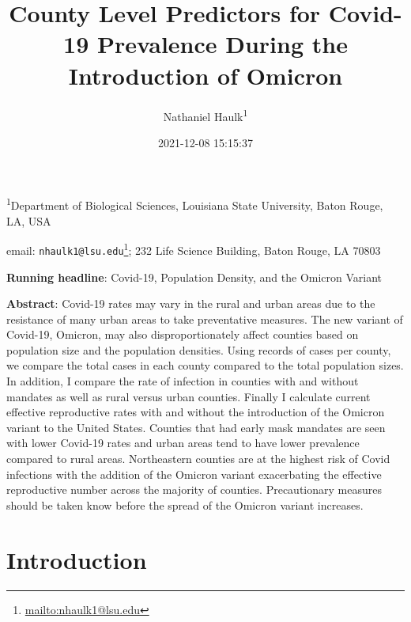 \documentclass[
  12pt,
]{article}
\title{County Level Predictors for Covid-19 Prevalence During the Introduction of Omicron}
\author{Nathaniel Haulk\textsuperscript{1}}
\date{2021-12-08 15:15:37}
\DeclareRobustCommand{\href}[2]{#2\footnote{\url{#1}}}
\begin{document}
\maketitle

\renewcommand{\figurename}{{\textbf{Figure}}}
\renewcommand{\tablename}{{\textbf{Table}}}

\footnotesize

\textsuperscript{1}Department of Biological Sciences, Louisiana State University, Baton Rouge, LA, USA

email: \href{mailto:nhaulk1@lsu.edu}{\nolinkurl{nhaulk1@lsu.edu}}; 232 Life Science Building, Baton Rouge, LA 70803

\normalsize

\textbf{Running headline}: Covid-19, Population Density, and the Omicron Variant

\textbf{Abstract}: Covid-19 rates may vary in the rural and urban areas due to the resistance of many urban areas to take preventative measures. The new variant of Covid-19, Omicron, may also disproportionately affect counties based on population size and the population densities. Using records of cases per county, we compare the total cases in each county compared to the total population sizes. In addition, I compare the rate of infection in counties with and without mandates as well as rural versus urban counties. Finally I calculate current effective reproductive rates with and without the introduction of the Omicron variant to the United States. Counties that had early mask mandates are seen with lower Covid-19 rates and urban areas tend to have lower prevalence compared to rural areas. Northeastern counties are at the highest risk of Covid infections with the addition of the Omicron variant exacerbating the effective reproductive number across the majority of counties. Precautionary measures should be taken know before the spread of the Omicron variant increases.

\clearpage

\hypertarget{introduction}{%
\section{Introduction}\label{introduction}}
\end{document}

